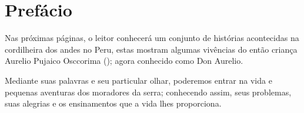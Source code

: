\cleardoublepage
\newpage
\thispagestyle{empty}
\vfill


\chapter*{Prefácio} %

Nas próximas páginas, o leitor conhecerá um conjunto de histórias acontecidas na cordilheira dos andes no Peru, estas mostram algumas vivências do então criança Aurelio Pujaico Osccorima (\Aulicha);
agora conhecido como Don Aurelio.

Mediante suas palavras e seu particular olhar, poderemos entrar na vida e pequenas aventuras dos moradores da serra; conhecendo assim, seus problemas, suas alegrias e os ensinamentos que a vida lhes proporciona. 
\vfill

